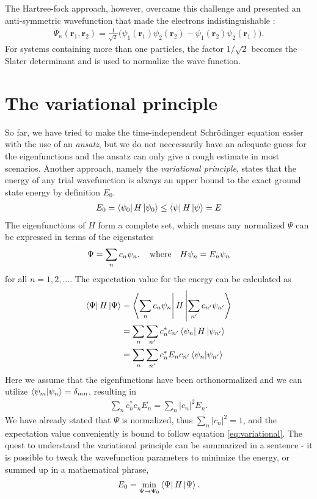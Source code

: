 The Hartree-fock approach, however, overcame this challenge and presented an anti-symmetric wavefunction that made the electrons indistinguishable \cite{Griffiths2017}:
\begin{align}
  \Psi_\kappa(\textbf{r}_1,\textbf{r}_2) = \frac{1}{\sqrt{2}}\Big( \psi_1(\textbf{r}_1) \psi_2(\textbf{r}_2)  - {\psi_1(\textbf{r}_2)\psi_2(\textbf{r}_1)}\Big).
\end{align}
For systems containing more than one particles, the factor $1/\sqrt{2}$ becomes the Slater determinant and is used to normalize the wave function.

\section{The variational principle}
So far, we have tried to make the time-independent Schrödinger equation easier with the use of an \textit{ansatz}, but we do not neccessarily have an adequate guess for the eigenfunctions and the ansatz can only give a rough estimate in most scenarios. Another approach, namely the \textit{variational principle}, states that the energy of any trial wavefunction is always an upper bound to the exact ground state energy by definition $E_0$.
\begin{align}
  E_0 = \bra{\psi_0 } H \ket{\psi_0} \leq \bra{\psi}H\ket{\psi} = E
  \label{eq:variational}
\end{align}
The eigenfunctions of $H$ form a complete set, which means any normalized $\Psi$ can be expressed in terms of the eigenstates
\begin{align}
  \Psi = \sum_n c_n \psi_n, \quad \textnormal{where} \quad H\psi_n = E_n \psi_n
\end{align}
for all $n = 1,2, ...$. The expectation value for the energy can be calculated as
\begin{align*}
  \bra{\Psi}H\ket{\Psi} &= \bra{\sum_{n}c_n \psi_n} H \ket{\sum_{n'} c_{n'}\psi_{n'}} \\
  &= \sum_n \sum_{n'} c_{n}^* c_{n'} \bra{\psi_n}H\ket{\psi_{n'}} \\
  &= \sum_n \sum_{n'} c_{n}^* E_n c_{n'} \bra{\psi_{n}}\ket{\psi_{n'}} \\
\end{align*}
Here we assume that the eigenfunctions have been orthonormalized and we can utilize $\bra{\psi_{m}}\ket{\psi_{n}}=\delta_{mn}$, resulting in
\begin{align*}
  \sum_n c_n^*c_n E_n = \sum_n \lvert c_n \rvert^2 E_n.
\end{align*}
We have already stated that $\Psi$ is normalized, thus $\sum_n \lvert c_n \rvert ^2 = 1 $, and the expectation value conveniently is bound to follow equation \ref{eq:variational}.
The quest to understand the variational principle can be summarized in a sentence - it is possible to tweak the wavefunction parameters to minimize the energy, or summed up in a mathematical phrase,
\begin{align}
  E_0 = \min_{\Psi \rightarrow \Psi_0} \bra{\Psi}H\ket{\Psi}.
\end{align}


